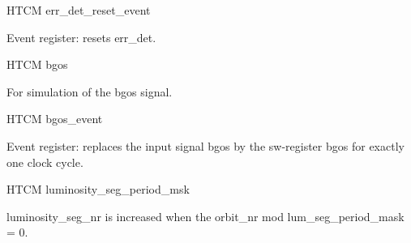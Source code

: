 \begin{register}{H}{TCM err\_det\_reset\_event}{}%
	\label{err_det_reset_event}%
	\regnewline%

	\begin{regdesc}
	\begin{reglist}
 		\item [err\_det\_reset\_event] Event register: resets err\_det.
	\end{reglist}
	\end{regdesc}
\end{register}

\begin{register}{H}{TCM bgos}{}%
	\label{bgos}%
	\regnewline%

	\begin{regdesc}
	\begin{reglist}
 		\item [bgos] For simulation of the bgos signal.
	\end{reglist}
	\end{regdesc}
\end{register}

\begin{register}{H}{TCM bgos\_event}{}%
	\label{bgos_event}%
	\regnewline%

	\begin{regdesc}
	\begin{reglist}
 		\item [bgos\_event] Event register: replaces the input signal bgos by the sw-register bgos for exactly one clock cycle.
	\end{reglist}
	\end{regdesc}
\end{register}

\begin{register}{H}{TCM luminosity\_seg\_period\_msk}{}%
	\label{luminosity_seg_period_msk}%

	\begin{regdesc}
	\begin{reglist}
 		\item [luminosity\_seg\_period\_msk] luminosity\_seg\_nr is increased when the orbit\_nr mod lum\_seg\_period\_mask = 0.
	\end{reglist}
	\end{regdesc}
\end{register}

